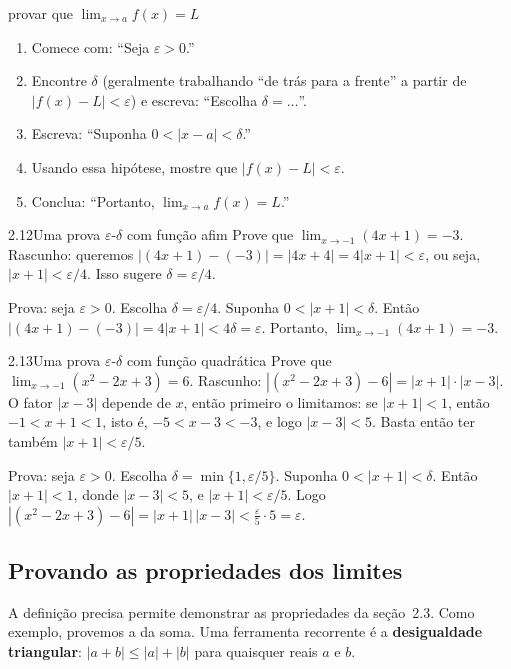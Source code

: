 \begin{estrategia}{provar que $\lim_{x\to a}f(x)=L$}
\begin{enumerate}[label=\arabic*.]
\item Comece com: ``Seja $\varepsilon>0$.''
\item Encontre $\delta$ (geralmente trabalhando ``de trás para a frente'' a partir de
  $|f(x)-L|<\varepsilon$) e escreva: ``Escolha $\delta=\ldots$''.
\item Escreva: ``Suponha $0<|x-a|<\delta$.''
\item Usando essa hipótese, mostre que $|f(x)-L|<\varepsilon$.
\item Conclua: ``Portanto, $\lim_{x\to a}f(x)=L$.''
\end{enumerate}
\end{estrategia}

\begin{exemplo}{2.12}{Uma prova $\varepsilon$-$\delta$ com função afim}
Prove que $\lim_{x\to-1}(4x+1)=-3$.
\solucao
Rascunho: queremos $|(4x+1)-(-3)|=|4x+4|=4|x+1|<\varepsilon$, ou seja, $|x+1|<\varepsilon/4$.
Isso sugere $\delta=\varepsilon/4$.

Prova: seja $\varepsilon>0$. Escolha $\delta=\varepsilon/4$. Suponha $0<|x+1|<\delta$.
Então $|(4x+1)-(-3)|=4|x+1|<4\delta=\varepsilon$. Portanto,
$\lim_{x\to-1}(4x+1)=-3$.
\end{exemplo}

\begin{exemplo}{2.13}{Uma prova $\varepsilon$-$\delta$ com função quadrática}
Prove que $\lim_{x\to-1}(x^2-2x+3)=6$.
\solucao
Rascunho: $|(x^2-2x+3)-6|=|x+1|\cdot|x-3|$. O fator $|x-3|$ depende de $x$, então
primeiro o limitamos: se $|x+1|<1$, então $-1<x+1<1$, isto é, $-5<x-3<-3$, e logo
$|x-3|<5$. Basta então ter também $|x+1|<\varepsilon/5$.

Prova: seja $\varepsilon>0$. Escolha $\delta=\min\{1,\varepsilon/5\}$. Suponha
$0<|x+1|<\delta$. Então $|x+1|<1$, donde $|x-3|<5$, e $|x+1|<\varepsilon/5$. Logo
$|(x^2-2x+3)-6|=|x+1|\,|x-3|<\tfrac{\varepsilon}{5}\cdot5=\varepsilon$.
\end{exemplo}

\subsection{Provando as propriedades dos limites}

A definição precisa permite demonstrar as propriedades da seção~2.3. Como exemplo,
provemos a da soma. Uma ferramenta recorrente é a \textbf{desigualdade triangular}:
$|a+b|\le|a|+|b|$ para quaisquer reais $a$ e $b$.

